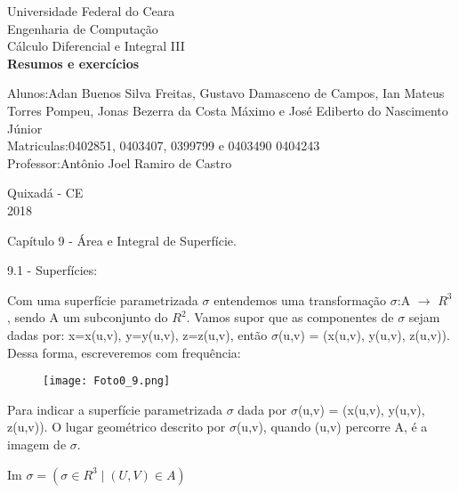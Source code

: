 \documentclass[11pt,a4paper]{article}
\begin{document}
\begin{titlepage}
\begin{center}
{\large Universidade Federal do Ceara}\\[0.2cm] 
{\large Engenharia de Computação}\\[0.2cm]
{\large Cálculo Diferencial e Integral III}\\[5.1cm]
{\bf \huge Resumos e exercícios}\\[6.1cm] %
\end{center} %
{\large Alunos:Adan Buenos Silva Freitas, Gustavo Damasceno de Campos, Ian Mateus Torres Pompeu, Jonas Bezerra da Costa Máximo e José Ediberto do Nascimento Júnior}\\[0.7cm]
{\large Matriculas:0402851, 0403407, 0399799 e 0403490 0404243}\\[0.7cm]
{\large Professor:Antônio Joel Ramiro de Castro}\\[5.1cm]
\begin{center}
{\large Quixadá - CE}\\[0.2cm]
{\large 2018}
\end{center}
\end{titlepage}

\begin{center}
		\Large Capítulo 9 - Área e Integral de Superfície.
	\end{center}
	
	\begin{large}
		9.1 - Superfícies:
	\end{large}
	
    Com uma superfície parametrizada $\sigma$ entendemos uma transformação $\sigma$:A $\rightarrow$ $R^3$, sendo A um subconjunto do $R^2$. Vamos supor que as componentes de  $\sigma$ sejam dadas por: x=x(u,v), y=y(u,v), z=z(u,v), então  $\sigma$(u,v) = (x(u,v), y(u,v), z(u,v)). Dessa forma, escreveremos com frequência: \\
    
	\begin{figure}[h]	
	\centering %
	\texttt{[image: Foto0\_9.png]} 
	\end{figure}
	Para indicar a superfície parametrizada $\sigma$ dada por $\sigma$(u,v) = (x(u,v), y(u,v), z(u,v)). O lugar geométrico descrito por $\sigma$(u,v), quando (u,v) percorre A, é a imagem de $\sigma$.
	
		\begin{center}
		Im $\sigma = (\sigma \in R^3 \mid (U,V) \in A)$
	    \end{center}
	    
\end{document}
